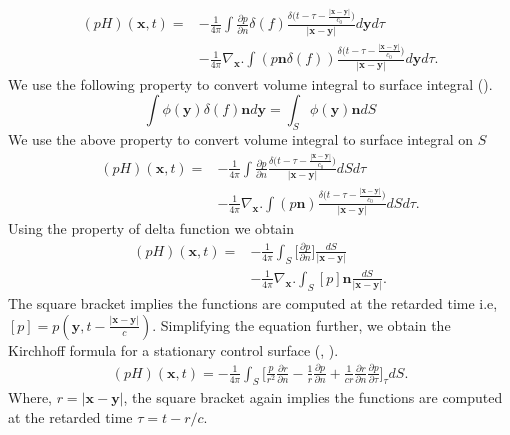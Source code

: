 \documentclass[12pt]{article}
\begin{document}
\begin{equation}
	\begin{split}
		(pH)(\mathbf{x}, t) = &-\frac{1}{4\pi}\int {\frac{\partial p}{\partial n}\delta(f) \frac{\delta \Big(t - \tau - \frac{|\mathbf{x} - \mathbf{y}|}{c_{0}}\Big)}{|\mathbf{x} - \mathbf{y}|}} d\mathbf{y}d\tau \\
		&-\frac{1}{4\pi}\nabla_{\mathbf{x}}.\int (p \mathbf{n} \delta(f)){\frac{\delta \Big(t - \tau - \frac{|\mathbf{x} - \mathbf{y}|}{c_{0}}\Big)}{|\mathbf{x} - \mathbf{y}|}} d\mathbf{y}d\tau.
	\end{split}
\end{equation}
We use the following property to convert volume integral to surface integral (\cite{FARASSAT1988451}).
\begin{equation}\label{volume surface}
	\int \phi (\mathbf{y}) \delta (f) \mathbf{n} d\mathbf{y} = \int_{S} \phi (\mathbf{y}) \mathbf{n} dS
\end{equation}
We use the above property to convert volume integral to surface integral on $S$
\begin{equation}
	\begin{split}
		(pH)(\mathbf{x}, t) = &-\frac{1}{4\pi}\int {\frac{\partial p}{\partial n} \frac{\delta \Big(t - \tau - \frac{|\mathbf{x} - \mathbf{y}|}{c_{0}}\Big)}{|\mathbf{x} - \mathbf{y}|}} dSd\tau \\
		&-\frac{1}{4\pi}\nabla_{\mathbf{x}}.\int (p \mathbf{n} ){\frac{\delta \Big(t - \tau - \frac{|\mathbf{x} - \mathbf{y}|}{c_{0}}\Big)}{|\mathbf{x} - \mathbf{y}|}} dSd\tau.
	\end{split}
\end{equation}
Using the property of delta function we obtain
\begin{equation}
	\begin{split}
		(pH)(\mathbf{x}, t) = &-\frac{1}{4\pi}\int_{S} { \Big[\frac{\partial p}{\partial n}\Big] \frac{dS}{|\mathbf{x} - \mathbf{y}|}}  \\
		&-\frac{1}{4\pi}\nabla_{\mathbf{x}}.\int_{S} [p]\mathbf{n}{\frac{dS}{|\mathbf{x} - \mathbf{y}|}} .
	\end{split}
\end{equation}
The square bracket implies the functions are computed at the retarded time i.e, $[p] = p(\mathbf{y}, t - \frac{|\mathbf{x} - \mathbf{y}|}{c})$. Simplifying the equation further, we obtain the Kirchhoff formula for a stationary control surface (\cite{FARASSAT1988451}, \cite{jamaluddin}).
\begin{equation}\label{Kirchhoff Integral}
	\begin{split}
		(pH)(\mathbf{x}, t) = -\frac{1}{4\pi}\int_{S}\Big[  \frac{p}{r^{2}}\frac{\partial r}{\partial n} - \frac{1}{r}\frac{\partial p}{\partial n} + \frac{1}{c r}\frac{\partial r}{\partial n}\frac{\partial p}{\partial \tau} \Big]_{\tau} dS.
	\end{split}
\end{equation}
Where, $r = |\mathbf{x} - \mathbf{y}|$, the square bracket again implies the functions are computed at the retarded time $\tau = t - r/c$.
\end{document}
